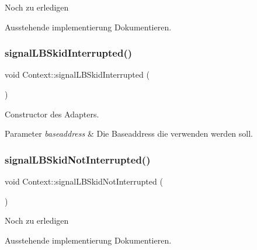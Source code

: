 \begin{DoxyRefDesc}{Noch zu erledigen}
\item[\hyperlink{todo__todo000012}{Noch zu erledigen}]Ausstehende implementierung Dokumentieren. \end{DoxyRefDesc}
\hypertarget{class_context_a41c95a05dffe3e6d89ebe5a6522e3a6a}{}\label{class_context_a41c95a05dffe3e6d89ebe5a6522e3a6a} 
\subsubsection{\texorpdfstring{signal\+L\+B\+Skid\+Interrupted()}{signalLBSkidInterrupted()}\hspace{0.1cm}{\footnotesize\ttfamily [2/2]}}
{\footnotesize\ttfamily void Context\+::signal\+L\+B\+Skid\+Interrupted (\begin{DoxyParamCaption}{ }\end{DoxyParamCaption})}

Constructor des Adapters.


\begin{DoxyParams}{Parameter}
{\em baseaddress} & Die Baseaddress die verwenden werden soll. \\
\hline
\end{DoxyParams}
\hypertarget{class_context_a54d07729fce18877b7fa671e5622c2cd}{}\label{class_context_a54d07729fce18877b7fa671e5622c2cd} 
\subsubsection{\texorpdfstring{signal\+L\+B\+Skid\+Not\+Interrupted()}{signalLBSkidNotInterrupted()}\hspace{0.1cm}{\footnotesize\ttfamily [1/2]}}
{\footnotesize\ttfamily void Context\+::signal\+L\+B\+Skid\+Not\+Interrupted (\begin{DoxyParamCaption}{ }\end{DoxyParamCaption})}

\begin{DoxyRefDesc}{Noch zu erledigen}
\item[\hyperlink{todo__todo000013}{Noch zu erledigen}]Ausstehende implementierung Dokumentieren. \end{DoxyRefDesc}
\hypertarget{class_context_a54d07729fce18877b7fa671e5622c2cd}{}\label{class_context_a54d07729fce18877b7fa671e5622c2cd} 

